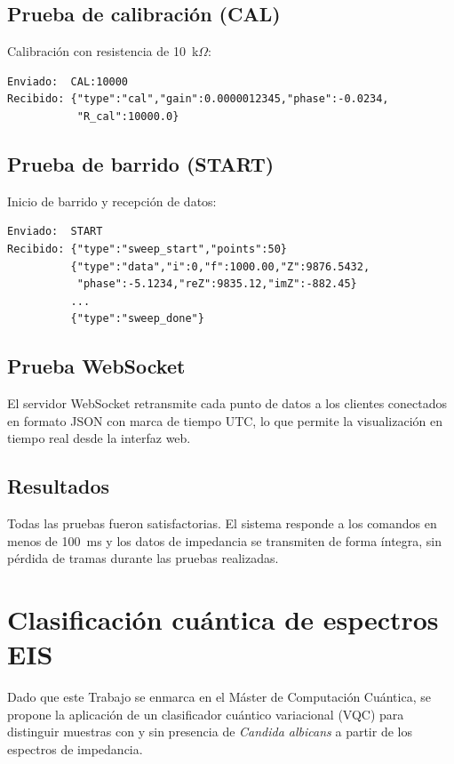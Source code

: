 \documentclass[11pt,a4paper,spanish]{book}
\begin{document}
\section{Prueba de calibraci\'{o}n (CAL)}

Calibraci\'{o}n con resistencia de 10~k$\Omega$:
\begin{lstlisting}
Enviado:  CAL:10000
Recibido: {"type":"cal","gain":0.0000012345,"phase":-0.0234,
           "R_cal":10000.0}
\end{lstlisting}

\section{Prueba de barrido (START)}

Inicio de barrido y recepci\'{o}n de datos:
\begin{lstlisting}
Enviado:  START
Recibido: {"type":"sweep_start","points":50}
          {"type":"data","i":0,"f":1000.00,"Z":9876.5432,
           "phase":-5.1234,"reZ":9835.12,"imZ":-882.45}
          ...
          {"type":"sweep_done"}
\end{lstlisting}

\section{Prueba WebSocket}

El servidor WebSocket retransmite cada punto de datos a los clientes conectados en formato JSON con marca de tiempo UTC, lo que permite la visualizaci\'{o}n en tiempo real desde la interfaz web.

\section{Resultados}

Todas las pruebas fueron satisfactorias. El sistema responde a los comandos en menos de 100~ms y los datos de impedancia se transmiten de forma \'{i}ntegra, sin p\'{e}rdida de tramas durante las pruebas realizadas.


\chapter{Clasificaci\'{o}n cu\'{a}ntica de espectros EIS}

Dado que este Trabajo se enmarca en el M\'{a}ster de Computaci\'{o}n Cu\'{a}ntica, se propone la aplicaci\'{o}n de un clasificador cu\'{a}ntico variacional (VQC) para distinguir muestras con y sin presencia de \textit{Candida albicans} a partir de los espectros de impedancia.
\end{document}
